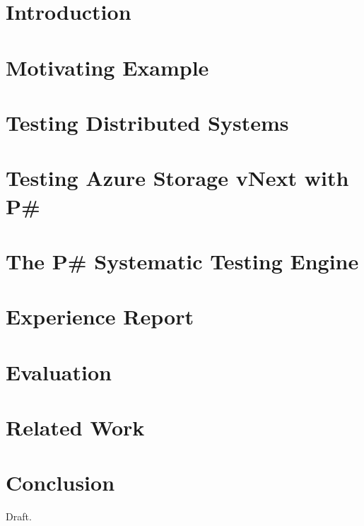 \documentclass[letterpaper,twocolumn,10pt]{article}
\newcommand{\psharp}{P\#\xspace}
\begin{document}
\section{Introduction}
\label{sec:intro}



\section{Motivating Example}
\label{sec:motivation}



\section{Testing Distributed Systems}
\label{sec:overview}



\section{Testing Azure Storage vNext with \psharp}
\label{sec:method}



\section{The \psharp Systematic Testing Engine}
\label{sec:psharp}



\section{Experience Report}
\label{sec:exp}



\section{Evaluation}
\label{sec:eval}



\section{Related Work}
\label{sec:rw}



\section{Conclusion}
\label{sec:concl}

Draft.



{\footnotesize 
}
\end{document}
